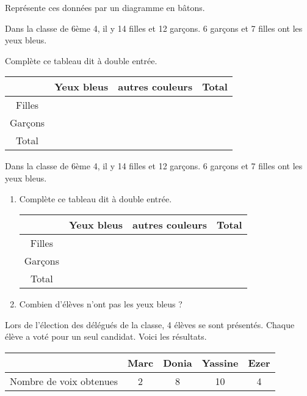 Représente ces données par un diagramme en bâtons.



Dans la classe de 6ème 4, il y 14 filles et 12 garçons. 6 garçons et 7 filles ont les yeux bleus.


Complète ce tableau dit à double entrée.

\begin{tabular}{|c|c|c|c|}
\hline 
  & Yeux bleus & autres couleurs & Total \\ 
\hline 
Filles &  &  &   \\ 
\hline 
Garçons &   &   &   \\ 
\hline 
Total &   &   &   \\ 
\hline 
\end{tabular} 




Dans la classe de 6ème 4, il y 14 filles et 12 garçons. 6 garçons et 7 filles ont les yeux bleus.

\begin{enumerate}
\item  Complète ce tableau dit à double entrée.

\begin{tabular}{|c|c|c|c|}
\hline 
  & Yeux bleus & autres couleurs & Total \\ 
\hline 
Filles &  &  &   \\ 
\hline 
Garçons &   &   &   \\ 
\hline 
Total &   &   &   \\ 
\hline 
\end{tabular} 
\item Combien d'élèves n'ont pas les yeux bleus ?
\end{enumerate}








Lors de l'élection des délégués de la classe, 4 élèves se sont présentés. Chaque élève a voté pour un seul candidat. Voici les résultats.

\begin{tabular}{|c|c|c|c|c|}
\hline 
  & Marc & Donia & Yassine & Ezer \\ 
\hline 
Nombre de voix obtenues & 2 & 8 & 10 & 4 \\ 
\hline 
\end{tabular} 


